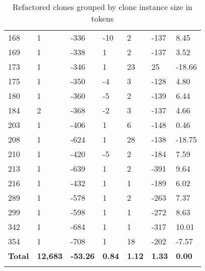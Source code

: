\begin{appendices}
\begin{longtable}[c]{@{}lllllll@{}}
168 & 1 & -336 & -10 & 2 & -137 & 8.45 \\
169 & 1 & -338 & 1 & 2 & -137 & 3.52 \\
173 & 1 & -346 & 1 & 23 & 25 & -18.66 \\
175 & 1 & -350 & -4 & 3 & -128 & 4.80 \\
180 & 1 & -360 & -5 & 2 & -139 & 6.44 \\
184 & 2 & -368 & -2 & 3 & -137 & 4.66 \\
203 & 1 & -406 & 1 & 6 & -148 & 0.46 \\
208 & 1 & -624 & 1 & 28 & -138 & -18.75 \\
210 & 1 & -420 & -5 & 2 & -184 & 7.59 \\
213 & 1 & -639 & 1 & 2 & -391 & 9.64 \\
216 & 1 & -432 & 1 & 1 & -189 & 6.02 \\
289 & 1 & -578 & 1 & 2 & -263 & 7.37 \\
299 & 1 & -598 & 1 & 1 & -272 & 8.63 \\
342 & 1 & -684 & 1 & 1 & -317 & 10.01 \\
354 & 1 & -708 & 1 & 18 & -202 & -7.57 \\* \midrule
\textbf{Total} & \textbf{12,683} & \textbf{-53.26} & \textbf{0.84} & \textbf{1.12} & \textbf{1.33} & \textbf{0.00} \\* \bottomrule
\caption{Refactored clones grouped by clone instance size in tokens}
\label{tab:full_token_refactoring}\\
\end{longtable}


\end{appendices}
